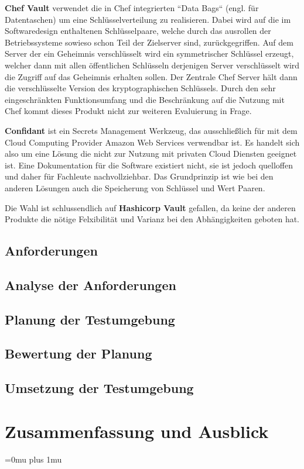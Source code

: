 \documentclass[
book,
a4paper,   
titlepage,  
halfparskip,
12pt        
]{scrartcl}
\begin{document}
\begin{onehalfspacing}
\textbf{Chef Vault} verwendet die in Chef integrierten ``Data Bags`` (engl. für Datentaschen) um eine Schlüsselverteilung zu realisieren. Dabei wird auf die im Softwaredesign enthaltenen Schlüsselpaare, welche durch das ausrollen der Betriebssysteme sowieso schon Teil der Zielserver sind, zurückgegriffen. Auf dem Server der ein Geheimnis verschlüsselt wird ein symmetrischer Schlüssel erzeugt, welcher dann mit allen öffentlichen Schlüsseln derjenigen Server verschlüsselt wird die Zugriff auf das Geheimnis erhalten sollen. Der Zentrale Chef Server hält dann die verschlüsselte Version des kryptographischen Schlüssels.\cite{chef} Durch den sehr eingeschränkten Funktionsumfang und die Beschränkung auf die Nutzung mit Chef kommt dieses Produkt nicht zur weiteren Evaluierung in Frage.

\textbf{Confidant} ist ein Secrets Management Werkzeug, das ausschließlich für mit dem Cloud Computing Provider Amazon Web Services verwendbar ist. Es handelt sich also um eine Lösung die nicht zur Nutzung mit privaten Cloud Diensten geeignet ist. Eine Dokumentation für die Software existiert nicht, sie ist jedoch quelloffen und daher für Fachleute nachvollziehbar. Das Grundprinzip ist wie bei den anderen Lösungen auch die Speicherung von Schlüssel und Wert Paaren.\cite{lyft}

Die Wahl ist schlussendlich auf \textbf{Hashicorp Vault} gefallen, da keine der anderen Produkte die nötige Felxibilität und Varianz bei den Abhängigkeiten geboten hat. 

\subsection{Anforderungen}
\subsection{Analyse der Anforderungen}
\subsection{Planung der Testumgebung}
\subsection{Bewertung der Planung}
\subsection{Umsetzung der Testumgebung}

\section{Zusammenfassung und Ausblick}
\label{sec:ausblick}


\newpage
\appendix
\Urlmuskip=0mu plus 1mu



\end{onehalfspacing}
\end{document}
